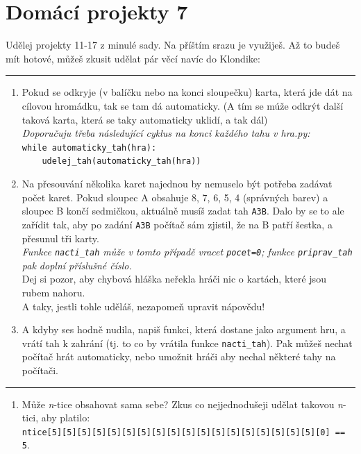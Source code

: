 \documentclass[a4paper,10pt]{article}
\newcommand\plsetno{7}
\begin{document}
\section*{Domácí projekty \plsetno}

Udělej projekty 11-17 z minulé sady. Na příštím srazu je využiješ.
Až to budeš mít hotové, můžeš zkusit udělat pár věcí navíc do Klondike:

\bigskip\bigskip
\hrule

\begin{enumerate}

\item Pokud se odkryje (v balíčku nebo na konci sloupečku) karta, která jde dát
    na cílovou hromádku, tak se tam dá automaticky.
    (A tím se múže odkrýt další taková karta, která se taky automaticky
    uklidí, a tak dál)
    \\\emph{Doporučuju třeba následující cyklus na konci každého tahu v hra.py:}
    \\\verb+while automaticky_tah(hra):+
    \\\verb+    udelej_tah(automaticky_tah(hra))+

\item Na přesouvání několika karet najednou by nemuselo být potřeba zadávat
    počet karet. Pokud sloupec A obsahuje 8, 7, 6, 5, 4 (správných barev)
    a sloupec B končí sedmičkou, aktuálně musíš zadat tah \verb+A3B+.
    Dalo by se to ale zařídit tak, aby po zadání \verb+A3B+ počítač
    sám zjistil, že na B patří šestka, a přesunul tři karty.
    \\\emph{Funkce \texttt{nacti\_tah} může v tomto případě vracet \texttt{pocet=0};
            funkce \texttt{priprav\_tah} pak doplní příslušné číslo.}
    \\Dej si pozor, aby chybová hláška neřekla hráči nic o kartách, které jsou
    rubem nahoru.
    \\A taky, jestli tohle uděláš, nezapomeň upravit nápovědu!

\item A kdyby ses hodně nudila, napiš funkci, která dostane jako argument hru,
    a vrátí tah k zahrání (tj. to co by vrátila funkce \verb+nacti_tah+).
    Pak můžeš nechat počítač hrát automaticky, nebo umožnit hráči
    aby nechal některé tahy na počítači.

\end{enumerate}

\hrule

\begin{enumerate}[resume]

\item Může \emph{n}-tice obsahovat sama sebe? Zkus co nejjednodušeji udělat takovou \emph{n}-tici, aby platilo:
    \\\verb+ntice[5][5][5][5][5][5][5][5][5][5][5][5][5][5][5][5][5][5][0] == 5+.

\end{enumerate}
\end{document}
